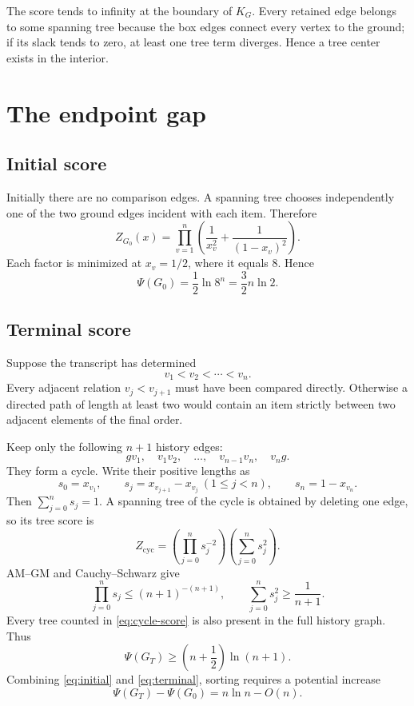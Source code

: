 \documentclass[11pt]{article}
\theoremstyle{definition}
\newcommand{\1}{\mathbf{1}}
\begin{document}
The score tends to infinity at the boundary of $K_G$.  Every retained edge belongs to some spanning tree because the box edges connect every vertex to the ground; if its slack tends to zero, at least one tree term diverges.  Hence a tree center exists in the interior.

\section{The endpoint gap}

\subsection{Initial score}

Initially there are no comparison edges.  A spanning tree chooses independently one of the two ground edges incident with each item.  Therefore
\[
Z_{G_0}(x)=\prod_{v=1}^n\left(\frac1{x_v^2}+\frac1{(1-x_v)^2}\right).
\]
Each factor is minimized at $x_v=1/2$, where it equals $8$.  Hence
\begin{equation}
\Psi(G_0)=\frac12\ln 8^n=\frac32n\ln2.
\label{eq:initial}
\end{equation}

\subsection{Terminal score}

Suppose the transcript has determined
\[
v_1<v_2<\cdots<v_n.
\]
Every adjacent relation $v_j<v_{j+1}$ must have been compared directly.  Otherwise a directed path of length at least two would contain an item strictly between two adjacent elements of the final order.

Keep only the following $n+1$ history edges:
\[
gv_1,\quad v_1v_2,\quad\ldots,\quad v_{n-1}v_n,\quad v_ng.
\]
They form a cycle.  Write their positive lengths as
\[
s_0=x_{v_1},\qquad
s_j=x_{v_{j+1}}-x_{v_j}\ (1\le j<n),\qquad
s_n=1-x_{v_n}.
\]
Then $\sum_{j=0}^n s_j=1$.  A spanning tree of the cycle is obtained by deleting one edge, so its tree score is
\begin{equation}
Z_{\mathrm{cyc}}
 =\left(\prod_{j=0}^n s_j^{-2}\right)
  \left(\sum_{j=0}^n s_j^2\right).
\label{eq:cycle-score}
\end{equation}
AM--GM and Cauchy--Schwarz give
\[
\prod_{j=0}^n s_j\le(n+1)^{-(n+1)},
\qquad
\sum_{j=0}^n s_j^2\ge\frac1{n+1}.
\]
Every tree counted in \eqref{eq:cycle-score} is also present in the full history graph.  Thus
\begin{equation}
\Psi(G_T)\ge\left(n+\frac12\right)\ln(n+1).
\label{eq:terminal}
\end{equation}
Combining \eqref{eq:initial} and \eqref{eq:terminal}, sorting requires a potential increase
\begin{equation}
\Psi(G_T)-\Psi(G_0)=n\ln n-O(n).
\label{eq:endpoint-gap}
\end{equation}
\end{document}
